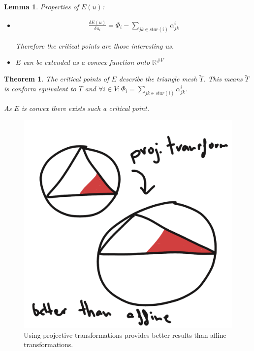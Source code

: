 \documentclass[]{article}
\newtheorem{lemma}{Lemma}
\newtheorem{theorem}{Theorem}
\begin{document}
\begin{lemma}
	Properties of $E(u)$:
	\begin{itemize}
		\item
		\begin{align*}
			\frac{\delta E(u)}{\delta u_i} = \Phi_i - \sum_{jk \in star(i)} \alpha_{jk}^i
		\end{align*}
		
		Therefore the critical points are those interesting us.
		\item  $E$ can be extended as a convex function onto $\mathbb{R}^{\# V}$
	\end{itemize}
\end{lemma}

\begin{theorem}
	The critical points of $E$ describe the triangle mesh $\tilde{T}$. This means $\tilde{T}$ is conform equivalent to $T$ and $\forall i \in V: \Phi_i = \sum_{jk \in star(i)} \alpha_{jk}^i$.
	
	As $E$ is convex there exists such a critical point.
\end{theorem}

\begin{figure}[h!]
	\centering
	\includegraphics[width=0.3\linewidth]{figures/proj_transform_as_color}
	\caption{Using projective transformations provides better results than affine transformations.}
	\label{fig:proj_transform_as_color}
\end{figure}
\end{document}
